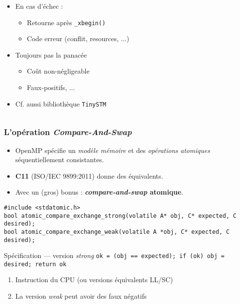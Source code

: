 \documentclass[xcolor={x11names,svgnames},x11names,svgnames]{beamer}
\begin{document}
\begin{frame}[fragile, label=rtm]
\begin{columns}
\begin{column}{0.63\textwidth}
\begin{itemize}
    \medskip

  \item \alert{En cas d'échec} :
    \begin{itemize}
    \item Retourne après \verb|_xbegin()|
    \item Code erreur (conflit, resources, ...)
    \end{itemize}

    \medskip

  \item Toujours pas la panacée
    \begin{itemize}
    \item Coût non-négligeable
    \item Faux-positifs, ...
    \end{itemize}

    \medskip

  \item Cf. aussi bibliothèque \texttt{TinySTM}
  \end{itemize}
\end{column}
\end{columns}
\end{frame}


\begin{frame}[fragile, label=CAS]
  \frametitle{L'opération \emph{Compare-And-Swap}}

  \small
  \begin{itemize}
  \item OpenMP spécifie un \emph{modèle mémoire} et des \emph{opérations
      atomiques} séquentiellement consistantes.
  \item \textbf{C11} (ISO/IEC 9899:2011) donne des équivalents.
  \item Avec un (gros) bonus : \textbf{\emph{compare-and-swap} \alert{atomique}}.
  \end{itemize}

\medskip
  
\begin{verbatim}
#include <stdatomic.h>
bool atomic_compare_exchange_strong(volatile A* obj, C* expected, C desired);
bool atomic_compare_exchange_weak(volatile A *obj, C* expected, C desired);
\end{verbatim}

\medskip

\begin{block}{Spécification --- version \emph{strong}}
  \texttt{ok = (obj == expected); if (ok) obj = desired; return ok}%
\end{block}

\medskip

\begin{enumerate}
\item Instruction du CPU (ou versions équivalents LL/SC)
\item La version \emph{weak} peut avoir des faux négatifs
\end{enumerate}

\end{frame}
\end{document}
